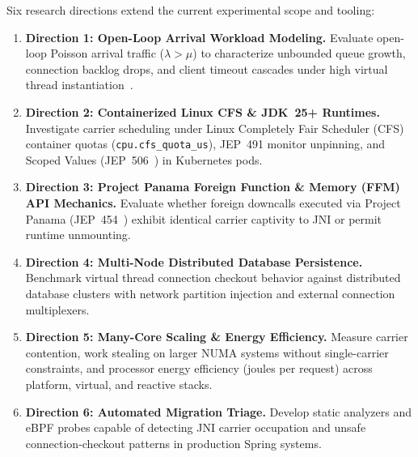 Six research directions extend the current experimental scope and tooling:
\begin{enumerate}
  \item \textbf{Direction 1: Open-Loop Arrival Workload Modeling.} Evaluate open-loop Poisson arrival traffic ($\lambda > \mu$) to characterize unbounded queue growth, connection backlog drops, and client timeout cascades under high virtual thread instantiation~\cite{Schroeder2006}.
  \item \textbf{Direction 2: Containerized Linux CFS \& JDK~25+ Runtimes.} Investigate carrier scheduling under Linux Completely Fair Scheduler (CFS) container quotas (\texttt{cpu.cfs\_quota\_us}), JEP~491 monitor unpinning, and Scoped Values (JEP~506~\cite{JEP506}) in Kubernetes pods.
  \item \textbf{Direction 3: Project Panama Foreign Function \& Memory (FFM) API Mechanics.} Evaluate whether foreign downcalls executed via Project Panama (JEP~454~\cite{JEP454}) exhibit identical carrier captivity to JNI or permit runtime unmounting.
  \item \textbf{Direction 4: Multi-Node Distributed Database Persistence.} Benchmark virtual thread connection checkout behavior against distributed database clusters with network partition injection and external connection multiplexers.
  \item \textbf{Direction 5: Many-Core Scaling \& Energy Efficiency.} Measure carrier contention, work stealing on larger NUMA systems without single-carrier constraints, and processor energy efficiency (joules per request) across platform, virtual, and reactive stacks.
  \item \textbf{Direction 6: Automated Migration Triage.} Develop static analyzers and eBPF probes capable of detecting JNI carrier occupation and unsafe connection-checkout patterns in production Spring systems.
\end{enumerate}
